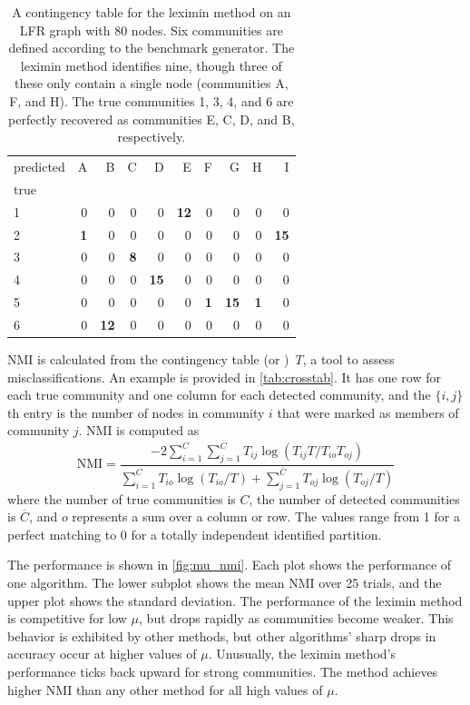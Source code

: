 \begin{table}
  \centering
  \caption{A contingency table for the leximin method on an LFR graph with 80 nodes. Six communities are defined according to the benchmark generator. The leximin method identifies nine, though three of these only contain a single node (communities A, F, and H). The true communities 1, 3, 4, and 6 are perfectly recovered as communities E, C, D, and B, respectively.}
  \begin{tabular}{l|rrrrrrrrr}
  \toprule
  predicted &  A &   B &  C &   D &   E &  F &   G &  H &   I \\
  true &    &     &    &     &     &    &     &    &     \\
  \midrule
  1    &  0 &   0 &  0 &   0 &  \textbf{12} &  0 &   0 &  0 &   0 \\
  2    &  \textbf{1} &   0 &  0 &   0 &   0 &  0 &   0 &  0 &  \textbf{15} \\
  3    &  0 &   0 &  \textbf{8} &   0 &   0 &  0 &   0 &  0 &   0 \\
  4    &  0 &   0 &  0 &  \textbf{15} &   0 &  0 &   0 &  0 &   0 \\
  5    &  0 &   0 &  0 &   0 &   0 &  \textbf{1} &  \textbf{15} &  \textbf{1} &   0 \\
  6    &  0 &  \textbf{12} &  0 &   0 &   0 &  0 &   0 &  0 &   0 \\
  \bottomrule
  \end{tabular}
  \label{tab:crosstab}
\end{table}

NMI is calculated from the contingency table (or )~$T$, a tool to assess misclassifications. An example is provided in \autoref{tab:crosstab}. It has one row for each true community and one column for each detected community, and the $\{i,j\}$th entry is the number of nodes in community $i$ that were marked as members of community $j$. NMI is computed as
\begin{equation}
\mathrm{NMI} = \frac
{-2\sum_{i=1}^{C} \sum_{j=1}^{\overline{C}} T_{ij} \log(T_{ij} T/T_{io}T_{oj})}
{\sum_{i=1}^C T_{io} \log(T_{io}/T) + \sum_{j=1}^{\overline{C}} T_{oj} \log(T_{oj}/T)}
\end{equation}
where the number of true communities is $C$, the number of detected communities is $\overline{C}$, and $o$ represents a sum over a column or row. The values range from 1 for a perfect matching to 0 for a totally independent identified partition. 

The performance is shown in \autoref{fig:mu_nmi}. Each plot shows the performance of one algorithm. The lower subplot shows the mean NMI over 25 trials, and the upper plot shows the standard deviation. The performance of the leximin method is competitive for low $\mu$, but drops rapidly as communities become weaker. This behavior is exhibited by other methods, but other algorithms' sharp drops in accuracy occur at higher values of $\mu$. Unusually, the leximin method's performance ticks back upward for strong communities. The method achieves higher NMI than any other method for all high values of $\mu$. 

